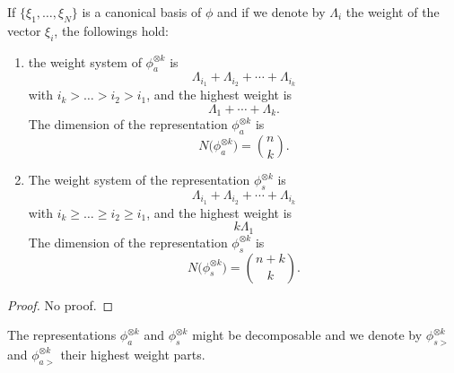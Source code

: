 \begin{proposition}
	If $\{ \xi_1,\ldots,\xi_N \}$ is a canonical basis of $\phi$ and if we denote by $\Lambda_i$ the weight of the vector $\xi_i$, the followings hold:
	\begin{enumerate}
		\item the weight system of $\phi^{\otimes k}_a$ is
		      \begin{equation}
			      \Lambda_{i_1}+\Lambda_{i_2}+\cdots+\Lambda_{i_k}
		      \end{equation}
		      with $i_k>\ldots>i_2>i_1$, and the highest weight is
		      \begin{equation}
			      \Lambda_1+\cdots+\Lambda_k.
		      \end{equation}
		      The dimension of the representation $\phi^{\otimes k}_a$ is
		      \begin{equation}
			      N\big( \phi^{\otimes k}_a \big)= {n\choose k}.
		      \end{equation}

		\item The weight system of the representation $\phi^{\otimes k}_s$ is
		      \begin{equation}
			      \Lambda_{i_1}+\Lambda_{i_2}+\cdots+\Lambda_{i_k}
		      \end{equation}
		      with $i_k\geq \ldots\geq i_2\geq i_1$, and the highest weight is
		      \begin{equation}
			      k\Lambda_1
		      \end{equation}
		      The dimension of the representation $\phi^{\otimes k}_s$ is
		      \begin{equation}
			      N\big( \phi^{\otimes k}_s \big)= {n+k\choose k}.
		      \end{equation}
	\end{enumerate}
\end{proposition}

\begin{proof}
	No proof.
\end{proof}
The representations $\phi^{\otimes k}_a$ and $\phi^{\otimes k}_s$ might be decomposable and we denote by $\phi^{\otimes k}_{s>}$ and $\phi^{\otimes k}_{a>}$ their highest weight parts.


